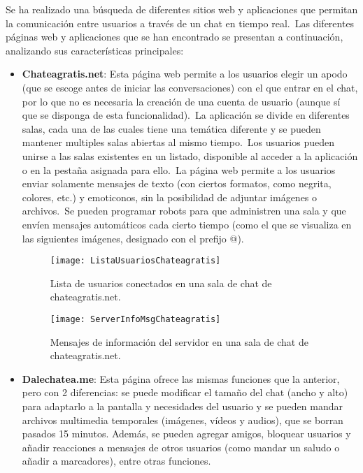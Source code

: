 
Se ha realizado una búsqueda de diferentes sitios web y aplicaciones que permitan la comunicación entre usuarios a
través de un chat en tiempo real.\ Las diferentes páginas web y aplicaciones que se han encontrado se presentan a
continuación, analizando sus características principales:

\begin{itemize}
	\item \textbf{Chateagratis.net}: Esta página web permite a los usuarios elegir un apodo (que se escoge antes de
	iniciar las conversaciones) con el que entrar en el chat, por lo que no es necesaria la creación de una cuenta de
	usuario (aunque sí que se disponga de esta funcionalidad).\ La aplicación se divide en diferentes salas, cada una
	de las cuales tiene una temática diferente y se pueden mantener multiples salas abiertas al mismo tiempo.\ Los
	usuarios pueden unirse a las salas existentes en un listado, disponible al acceder a la aplicación o en la pestaña
	asignada para ello.\ La página web permite a los usuarios enviar solamente mensajes de texto (con ciertos
	formatos, como negrita, colores, etc.) y emoticonos, sin la posibilidad de adjuntar imágenes o archivos.\ Se pueden
	programar robots para que administren una sala y que envíen mensajes automáticos cada cierto tiempo (como el que
	se visualiza en las siguientes imágenes, designado con el prefijo @).

	\begin{figure}[H]
		\centering
		\texttt{[image: ListaUsuariosChateagratis]}
		\caption{Lista de usuarios conectados en una sala de chat de chateagratis.net.}
		\label{fig:ListaUsuariosChateagratis}
	\end{figure}

	\begin{figure}[H]
		\centering
		\texttt{[image: ServerInfoMsgChateagratis]}
		\caption{Mensajes de información del servidor en una sala de chat de chateagratis.net.}
		\label{fig:ServerInfoMsgChateagratis}
	\end{figure}

	\item \textbf{Dalechatea.me}: Esta página ofrece las mismas funciones que la anterior, pero con 2 diferencias: se
	puede modificar el tamaño del chat (ancho y alto) para adaptarlo a la pantalla y necesidades del usuario y se
	pueden mandar archivos multimedia temporales (imágenes, vídeos y audios), que se borran pasados 15 minutos.
	Además, se pueden agregar amigos, bloquear usuarios y añadir reacciones a mensajes de otros usuarios (como mandar
	un saludo o añadir a marcadores), entre otras funciones.


\end{itemize}
